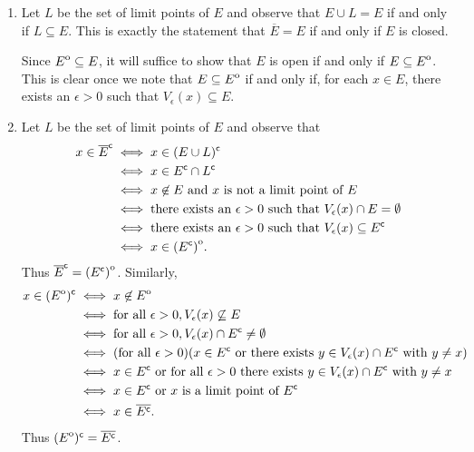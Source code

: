 \documentclass{lew98_solutions}
\begin{document}
\begin{solution}
    \begin{enumerate}
        \item Let \( L \) be the set of limit points of \( E \) and observe that \( E \cup L = E \) if and only if \( L \subseteq E \). This is exactly the statement that \( \overline{E} = E \) if and only if \( E \) is closed.

        Since \( {\kern0ptE}^{\mathrm{o}} \subseteq E \), it will suffice to show that \( E \) is open if and only if \( E \subseteq {\kern0ptE}^{\mathrm{o}} \). This is clear once we note that \( E \subseteq {\kern0ptE}^{\mathrm{o}} \) if and only if, for each \( x \in E \), there exists an \( \epsilon > 0 \) such that \( V_{\epsilon}(x) \subseteq E \).

        \item Let \( L \) be the set of limit points of \( E \) and observe that
        \begin{align*}
            x \in \overline{E}^{\mathsf{c}} &\iff x \in (E \cup L)^{\mathsf{c}} \\
            &\iff x \in E^{\mathsf{c}} \cap L^{\mathsf{c}} \\
            &\iff x \not\in E \text{ and } x \text{ is not a limit point of } E \\
            &\iff \text{there exists an } \epsilon > 0 \text{ such that } V_{\epsilon}(x) \cap E = \emptyset \\
            &\iff \text{there exists an } \epsilon > 0 \text{ such that } V_{\epsilon}(x) \subseteq E^{\mathsf{c}} \\
            &\iff x \in {\kern0pt(E^{\mathsf{c}})}^{\mathrm{o}}.
        \end{align*}
        Thus \( \overline{E}^{\mathsf{c}} = {\kern0pt(E^{\mathsf{c}})}^{\mathrm{o}} \). Similarly,
        \begin{align*}
            x \in ({\kern0ptE}^{\mathrm{o}})^{\mathsf{c}} &\iff x \not\in {\kern0ptE}^{\mathrm{o}} \\
            &\iff \text{for all } \epsilon > 0, V_{\epsilon}(x) \not\subseteq E \\
            &\iff \text{for all } \epsilon > 0, V_{\epsilon}(x) \cap E^{\mathsf{c}} \neq \emptyset \\
            &\iff (\text{for all } \epsilon > 0) (x \in E^{\mathsf{c}} \text{ or there exists } y \in V_{\epsilon}(x) \cap E^{\mathsf{c}} \text{ with } y \neq x) \\
            &\iff x \in E^{\mathsf{c}} \text{ or for all } \epsilon > 0 \text{ there exists } y \in V_{\epsilon}(x) \cap E^{\mathsf{c}} \text{ with } y \neq x \\
            &\iff x \in E^{\mathsf{c}} \text{ or } x \text{ is a limit point of } E^{\mathsf{c}} \\
            &\iff x \in \overline{E^{\mathsf{c}}}.
        \end{align*}
        Thus \( ({\kern0ptE}^{\mathrm{o}})^{\mathsf{c}} = \overline{E^{\mathsf{c}}} \).
    \end{enumerate}
\end{solution}
\end{document}
